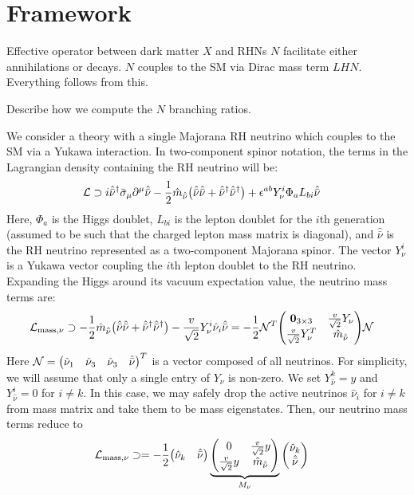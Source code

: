\documentclass[a4paper,11pt]{article} \pdfoutput=1
\newcommand{\rhn}{\bar{\nu}}
\begin{document}
\section{Framework}
\label{sec:framework}

Effective operator between dark matter $X$ and RHNs $N$ facilitate either annihilations or decays. $N$ couples to the SM via Dirac mass term $LHN$. Everything follows from this.

Describe how we compute the $N$ branching ratios.

We consider a theory with a single Majorana RH neutrino which couples to the SM
via a Yukawa interaction. In two-component spinor notation, the terms in the
Lagrangian density containing the RH neutrino will be:
\begin{align}
	\mathcal{L}
	 & \supset
	i\hat{\rhn}^{\dagger}\bar{\sigma}_{\mu}\partial^{\mu}\hat{\rhn}
	- \frac{1}{2}\hat{m}_{\hat{\rhn}}\qty(\hat{\rhn}\hat{\rhn} + \hat{\rhn}^{\dagger}\hat{\rhn}^{\dagger})
	+ \epsilon^{ab}Y^{i}_{\nu}\Phi_{a}L_{bi}\hat{\rhn}
\end{align}
Here, \(\Phi_{a}\) is the Higgs doublet, \(L_{bi}\) is the lepton doublet for
the \(i\)th generation (assumed to be such that the charged lepton mass matrix is diagonal),
and \(\hat{\rhn}\) is the RH neutrino represented as a two-component
Majorana spinor. The vector \(Y^{i}_{\nu}\) is a Yukawa vector coupling the
\(i\)th lepton doublet to the RH neutrino. Expanding the Higgs around its vacuum
expectation value, the neutrino mass terms are:
\begin{align}
	\mathcal{L}_{\mathrm{mass},\nu}
	                        & \supset
	- \frac{1}{2}\hat{m}_{\hat{\rhn}}\qty(\hat{\rhn}\hat{\rhn} + \hat{\rhn}^{\dagger}\hat{\rhn}^{\dagger})
	- \frac{v}{\sqrt{2}}Y^{i}_{\nu}\hat{\nu}_{i}\hat{\rhn}
	=
	-\frac{1}{2}
	\mathcal{N}^{T}
	\mqty(\bm{0}_{3\times3} & \frac{v}{\sqrt{2}}Y_{\nu} \\ \frac{v}{\sqrt{2}}Y^{T}_{\nu} & \hat{m}_{\hat{\rhn}})
	\mathcal{N}
\end{align}
Here \(\mathcal{N} = \mqty(\hat{\nu}_1 & \hat{\nu}_3 &\hat{\nu}_3&\hat{\rhn})^{T}\)
is a vector composed of all neutrinos. For simplicity, we will assume that only
a single entry of \(Y_{\nu}\) is non-zero. We set \(Y^{k}_{\hat{\nu}} = y\)
and \(Y^{i}_{\hat{\nu}} = 0\) for \(i\neq k\). In this case, we may safely drop
the active neutrinos \(\hat{\nu}_{i}\) for \(i\neq k\) from mass matrix and
take them to be mass eigenstates. Then, our neutrino mass terms reduce to
\begin{align}
	\mathcal{L}_{\mathrm{mass},\nu}
	                    & \supset
	=
	-\frac{1}{2}
	\mqty(\hat{\nu}_{k} & \hat{\rhn})
	\underbrace{\mqty(0 & \frac{v}{\sqrt{2}}y \\ \frac{v}{\sqrt{2}}y & \hat{m}_{\hat{\rhn}})}_{M_{\nu}}
	\mqty(\hat{\nu}_{k}                       \\ \hat{\rhn})
\end{align}
\end{document}
